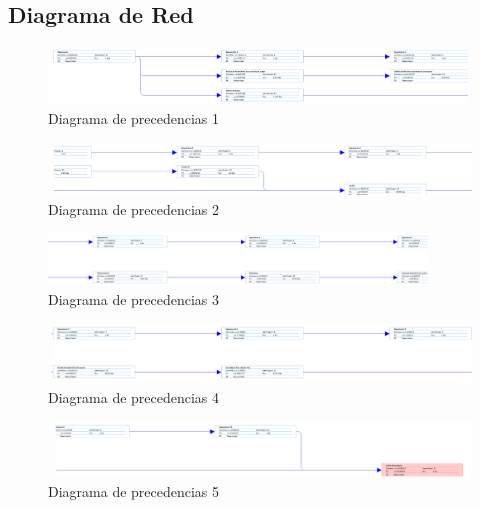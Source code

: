 			\FloatBarrier

		\subsection{Diagrama de Red}
			\begin{figure}[!htbp]
				\centering
				\includegraphics[scale=.4, angle=90]{fig/Red1}
				\caption{Diagrama de precedencias 1}
			\end{figure}

			\begin{figure}[!htbp]
				\centering
				\includegraphics[scale=.4, angle=90]{fig/Red2}
				\caption{Diagrama de precedencias 2}
			\end{figure}

			\begin{figure}[!htbp]
				\centering
				\includegraphics[scale=.4, angle=90]{fig/Red3}
				\caption{Diagrama de precedencias 3}
			\end{figure}

			\begin{figure}[!htbp]
				\centering
				\includegraphics[scale=.4, angle=90]{fig/Red4}
				\caption{Diagrama de precedencias 4}
			\end{figure}

			\begin{figure}[!htbp]
				\centering
				\includegraphics[scale=.4, angle=90]{fig/Red5}
				\caption{Diagrama de precedencias 5}
			\end{figure}

